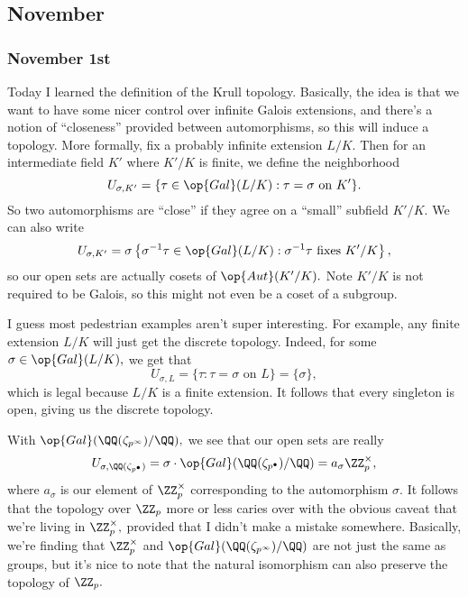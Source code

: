\subsection{November}
\subsubsection{November 1st}
Today I learned the definition of the Krull topology. Basically, the idea is that we want to have some nicer control over infinite Galois extensions, and there's a notion of ``closeness'' provided between automorphisms, so this will induce a topology. More formally, fix a probably infinite extension $L/K.$ Then for an intermediate field $K'$ where $K'/K$ is finite, we define the neighborhood
\[U_{\sigma,K'}=\{\tau\in\op{Gal}(L/K):\tau=\sigma\text{ on }K'\}.\]
So two automorphisms are ``close'' if they agree on a ``small'' subfield $K'/K.$ We can also write
\[U_{\sigma,K'}=\sigma\left\{\sigma^{-1}\tau\in\op{Gal}(L/K):\sigma^{-1}\tau\text{ fixes }K'/K\right\},\]
so our open sets are actually cosets of $\op{Aut}(K'/K).$ Note $K'/K$ is not required to be Galois, so this might not even be a coset of a subgroup.

I guess most pedestrian examples aren't super interesting. For example, any finite extension $L/K$ will just get the discrete topology. Indeed, for some $\sigma\in\op{Gal}(L/K),$ we get that
\[U_{\sigma,L}=\{\tau:\tau=\sigma\text{ on }L\}=\{\sigma\},\]
which is legal because $L/K$ is a finite extension. It follows that every singleton is open, giving us the discrete topology.

With $\op{Gal}(\QQ(\zeta_{p^\infty})/\QQ),$ we see that our open sets are really
\[U_{\sigma,\QQ(\zeta_{p^\bullet})}=\sigma\cdot\op{Gal}(\QQ(\zeta_{p^\bullet})/\QQ)=a_\sigma\ZZ_p^\times,\]
where $a_\sigma$ is our element of $\ZZ_p^\times$ corresponding to the automorphism $\sigma.$ It follows that the topology over $\ZZ_p$ more or less caries over with the obvious caveat that we're living in $\ZZ_p^\times,$ provided that I didn't make a mistake somewhere. Basically, we're finding that $\ZZ_p^\times$ and $\op{Gal}(\QQ(\zeta_{p^\infty})/\QQ)$ are not just the same as groups, but it's nice to note that the natural isomorphism can also preserve the topology of $\ZZ_p.$

